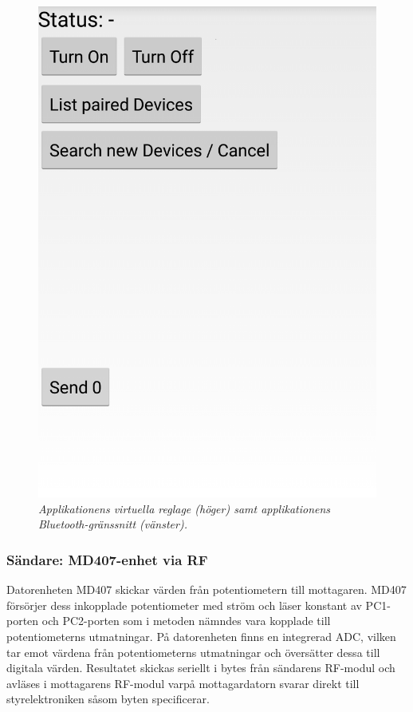 \documentclass[a4paper]{article}
\begin{document}
\begin{figure}[H]
\includegraphics[scale=0.2]{applikation2.png}
\centering
\caption{\it Applikationens virtuella reglage (höger) samt applikationens Bluetooth-gränssnitt (vänster).}
\end{figure} 

\subsubsection{Sändare: MD407-enhet via RF}
Datorenheten MD407 skickar värden från potentiometern till mottagaren. MD407 försörjer dess inkopplade potentiometer med ström och läser konstant av PC1-porten och PC2-porten som i metoden nämndes vara kopplade till potentiometerns utmatningar. På datorenheten finns en integrerad ADC, vilken tar emot värdena från potentiometerns utmatningar och översätter dessa till digitala värden. Resultatet skickas seriellt i bytes från sändarens RF-modul och avläses i mottagarens RF-modul varpå mottagardatorn svarar direkt till styrelektroniken såsom byten specificerar.
\end{document}
